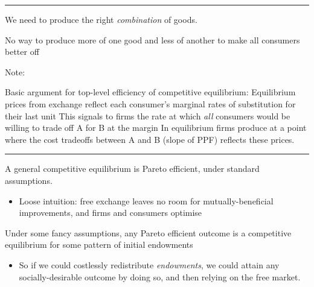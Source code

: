 \documentclass[]{article}
\providecommand{\tightlist}{%
  \setlength{\itemsep}{0pt}\setlength{\parskip}{0pt}}
\begin{document}
\begin{center}\rule{0.5\linewidth}{\linethickness}\end{center}

We need to produce the right \emph{combination} of goods.

\bigskip
\bigskip

\begin{description}
\tightlist
\item[Efficient allocation of resources (`top-level' condition)]
No way to produce more of one good and less of another to make all consumers better off
\end{description}

Note:

Basic argument for top-level efficiency of competitive equilibrium:
Equilibrium prices from exchange reflect each consumer's marginal rates of substitution for their last unit
This signals to firms the rate at which \emph{all} consumers would be willing to trade off A for B at the margin
In equilibrium firms produce at a point where the cost tradeoffs between A and B (slope of PPF) reflects these prices.

\begin{center}\rule{0.5\linewidth}{\linethickness}\end{center}

\begin{description}
\tightlist
\item[First fundamental theorem of welfare economics]
A general competitive equilibrium is Pareto efficient, under standard assumptions.
\end{description}

\begin{itemize}
\tightlist
\item
  Loose intuition: free exchange leaves no room for mutually-beneficial improvements, and firms and consumers optimise
\end{itemize}

\begin{description}
\tightlist
\item[Second fundamental theorem]
Under some fancy assumptions, any Pareto efficient outcome is a competitive equilibrium for some pattern of initial endowments
\end{description}

\begin{itemize}
\tightlist
\item
  So if we could costlessly redistribute \emph{endowments}, we could attain any socially-desirable outcome by doing so, and then relying on the free market.
\end{itemize}
\end{document}
